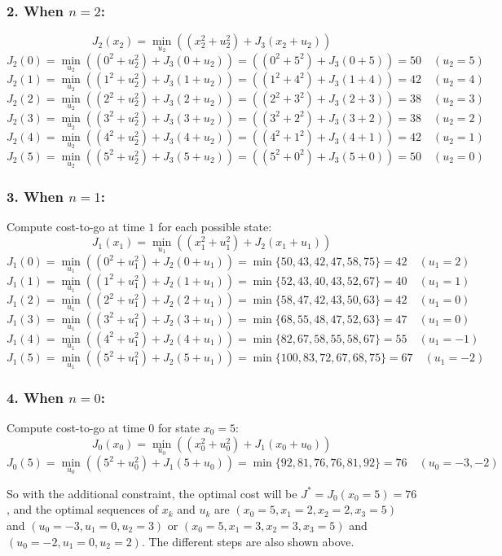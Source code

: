 \subsubsection*{2. When \( n = 2 \):}
\[ J_2(x_2) = \min_{u_2} ((x_2^2 + u_2^2) + J_{3}(x_2 + u_2)) \]
\[ J_2(0) = \min_{u_2} ((0^2 + u_2^2) + J_{3}(0 + u_2)) = ((0^2 + 5^2) + J_{3}(0 + 5)) = 50 \quad (u_2 = 5) \]
\[ J_2(1) = \min_{u_2} ((1^2 + u_2^2) + J_{3}(1 + u_2)) = ((1^2 + 4^2) + J_{3}(1 + 4)) = 42 \quad (u_2 = 4) \]
\[ J_2(2) = \min_{u_2} ((2^2 + u_2^2) + J_{3}(2 + u_2)) = ((2^2 + 3^2) + J_{3}(2 + 3)) = 38 \quad (u_2 = 3) \]
\[ J_2(3) = \min_{u_2} ((3^2 + u_2^2) + J_{3}(3 + u_2)) = ((3^2 + 2^2) + J_{3}(3 + 2)) = 38 \quad (u_2 = 2) \]
\[ J_2(4) = \min_{u_2} ((4^2 + u_2^2) + J_{3}(4 + u_2)) = ((4^2 + 1^2) + J_{3}(4 + 1)) = 42 \quad (u_2 = 1) \]
\[ J_2(5) = \min_{u_2} ((5^2 + u_2^2) + J_{3}(5 + u_2)) = ((5^2 + 0^2) + J_{3}(5 + 0)) = 50 \quad (u_2 = 0) \]

\subsubsection*{3. When \( n = 1 \):}
Compute cost-to-go at time \( 1 \) for each possible state:
\[ J_1(x_1) = \min_{u_1} ((x_1^2 + u_1^2) + J_{2}(x_1 + u_1)) \]
\[ J_1(0) = \min_{u_1} ((0^2 + u_1^2) + J_{2}(0 + u_1)) = \min \{ 50, 43, 42, 47, 58, 75 \} = 42 \quad (u_1 = 2) \]
\[ J_1(1) = \min_{u_1} ((1^2 + u_1^2) + J_{2}(1 + u_1)) = \min \{ 52, 43, 40, 43, 52, 67 \} = 40 \quad (u_1 = 1) \]
\[ J_1(2) = \min_{u_1} ((2^2 + u_1^2) + J_{2}(2 + u_1)) = \min \{ 58, 47, 42, 43, 50, 63 \} = 42 \quad (u_1 = 0) \]
\[ J_1(3) = \min_{u_1} ((3^2 + u_1^2) + J_{2}(3 + u_1)) = \min \{ 68, 55, 48, 47, 52, 63 \} = 47 \quad (u_1 = 0) \]
\[ J_1(4) = \min_{u_1} ((4^2 + u_1^2) + J_{2}(4 + u_1)) = \min \{ 82, 67, 58, 55, 58, 67 \} = 55 \quad (u_1 = -1) \]
\[ J_1(5) = \min_{u_1} ((5^2 + u_1^2) + J_{2}(5 + u_1)) = \min \{ 100, 83, 72, 67, 68, 75 \} = 67 \quad (u_1 = -2) \]

\subsubsection*{4. When \( n = 0 \):}
Compute cost-to-go at time \( 0 \) for state \( x_0 = 5 \):
\[ J_0(x_0) = \min_{u_0} ((x_0^2 + u_0^2) + J_1(x_0 + u_0)) \]
\[ J_0(5) = \min_{u_0} ((5^2 + u_0^2) + J_1(5 + u_0)) = \min \{ 92, 81, 76, 76, 81, 92 \} = 76 \quad (u_0 = -3, -2) \]

So with the additional constraint, the optimal cost will be \( J^* = J_0(x_0=5) = 76 \), and the optimal sequences of \( x_k \) and \( u_k \) are \( (x_0=5, x_1=2, x_2=2, x_3=5) \) and \( (u_0=-3, u_1=0, u_2=3) \) or \( (x_0=5, x_1=3, x_2=3, x_3=5) \) and \( (u_0=-2, u_1=0, u_2=2) \). The different steps are also shown above.


